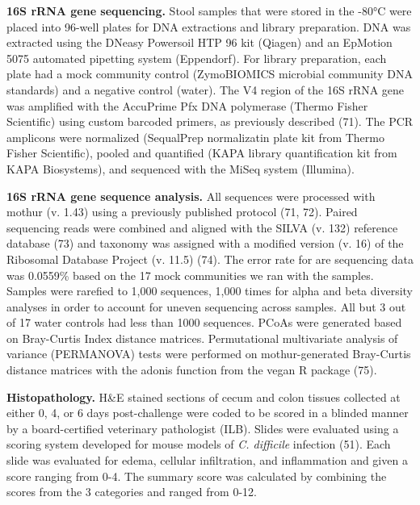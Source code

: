 \documentclass[
  11pt,
]{article}
\begin{document}
\textbf{16S rRNA gene sequencing.} Stool samples that were stored in the
-80°C were placed into 96-well plates for DNA extractions and library
preparation. DNA was extracted using the DNeasy Powersoil HTP 96 kit
(Qiagen) and an EpMotion 5075 automated pipetting system (Eppendorf).
For library preparation, each plate had a mock community control
(ZymoBIOMICS microbial community DNA standards) and a negative control
(water). The V4 region of the 16S rRNA gene was amplified with the
AccuPrime Pfx DNA polymerase (Thermo Fisher Scientific) using custom
barcoded primers, as previously described (71). The PCR amplicons were
normalized (SequalPrep normalizatin plate kit from Thermo Fisher
Scientific), pooled and quantified (KAPA library quantification kit from
KAPA Biosystems), and sequenced with the MiSeq system (Illumina).

\textbf{16S rRNA gene sequence analysis.} All sequences were processed
with mothur (v. 1.43) using a previously published protocol (71, 72).
Paired sequencing reads were combined and aligned with the SILVA (v.
132) reference database (73) and taxonomy was assigned with a modified
version (v. 16) of the Ribosomal Database Project (v. 11.5) (74). The
error rate for are sequencing data was 0.0559\% based on the 17 mock
communities we ran with the samples. Samples were rarefied to 1,000
sequences, 1,000 times for alpha and beta diversity analyses in order to
account for uneven sequencing across samples. All but 3 out of 17 water
controls had less than 1000 sequences. PCoAs were generated based on
Bray-Curtis Index distance matrices. Permutational multivariate analysis
of variance (PERMANOVA) tests were performed on mothur-generated
Bray-Curtis distance matrices with the adonis function from the vegan R
package (75).

\textbf{Histopathology.} H\&E stained sections of cecum and colon
tissues collected at either 0, 4, or 6 days post-challenge were coded to
be scored in a blinded manner by a board-certified veterinary
pathologist (ILB). Slides were evaluated using a scoring system
developed for mouse models of \emph{C. difficile} infection (51). Each
slide was evaluated for edema, cellular infiltration, and inflammation
and given a score ranging from 0-4. The summary score was calculated by
combining the scores from the 3 categories and ranged from 0-12.
\end{document}
